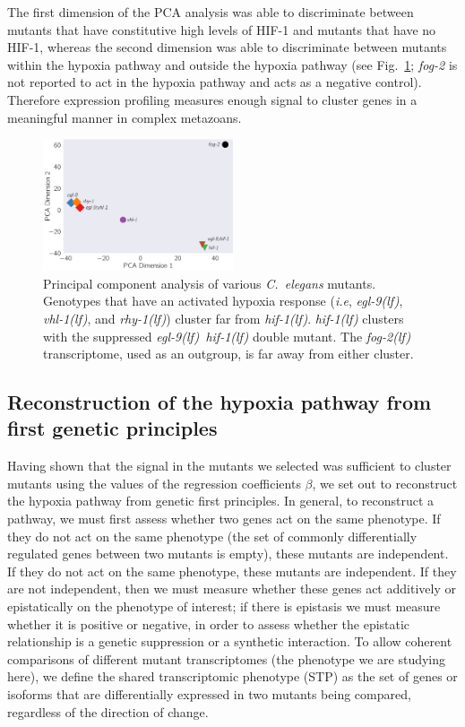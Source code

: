 \documentclass[10pt, onecolumn]{article}
\newcommand{\cel}{\emph{C.~elegans}}
\newcommand{\gene}[1]{\emph{#1}}
\newcommand{\fog}{\emph{\mbox{fog-2(lf)}}}
\newcommand{\egl}{\emph{\mbox{egl-9}(lf)}}
\newcommand{\rhy}{\emph{\mbox{rhy-1}(lf)}}
\newcommand{\vhl}{\emph{\mbox{vhl-1}(lf)}}
\newcommand{\eglhif}{\emph{\mbox{egl-9(lf)}~\mbox{hif-1(lf)}}}
\newcommand{\hif}{\emph{\mbox{hif-1(lf)}}}
\newcommand{\hifp}{HIF-1}
\begin{document}
The first dimension of the PCA analysis was able to discriminate between mutants
that have constitutive high levels of \hifp{} and mutants that have no \hifp{},
whereas the second dimension was able to discriminate between mutants within the
hypoxia pathway and outside the hypoxia pathway (see Fig.~\ref{fig:pca};
\gene{fog-2} is not reported to act in the hypoxia pathway and acts as a negative
control). Therefore expression profiling measures enough signal to cluster genes
in a meaningful manner in complex metazoans.

\begin{figure}[tbhp]
\centering
\includegraphics[width=0.5\textwidth]{../figs/pca.pdf}
\caption{
Principal component analysis of various \cel{} mutants. Genotypes that have an
activated hypoxia response (\emph{i.e}, \egl{}, \vhl{}, and \rhy{}) cluster far
from \hif{}. \hif{} clusters with the suppressed \eglhif{} double mutant.
The \fog{} transcriptome, used as an outgroup, is far away from either cluster.
}
\label{fig:pca}
\end{figure}

\subsection*{Reconstruction of the hypoxia pathway from first genetic principles}
\label{sec:reconstruct}
Having shown that the signal in the mutants we selected was sufficient to
cluster mutants using the values of the regression coefficients $\beta$, we set
out to reconstruct the hypoxia pathway from genetic first principles. In general,
to reconstruct a pathway, we must first assess whether two genes act on the same
phenotype. If they do not act on the same phenotype (the set of commonly
differentially regulated genes between two mutants is empty), these mutants are
independent. If they do not act on the same phenotype, these mutants are
independent. If they are not independent, then we must measure whether these
genes act additively or epistatically on the phenotype of interest; if there is
epistasis we must measure whether it is positive or negative, in order to assess
whether the epistatic relationship is a genetic suppression or a synthetic
interaction. To allow coherent comparisons of different mutant transcriptomes
(the phenotype we are studying here), we define the shared transcriptomic
phenotype (STP) as the set of genes or isoforms that are differentially
expressed in two mutants being compared, regardless of the direction of change.
\end{document}
